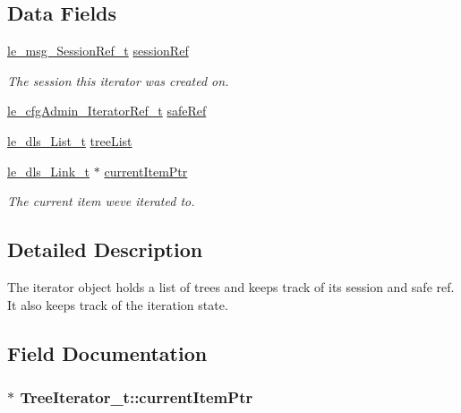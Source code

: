 \subsection*{Data Fields}
\begin{DoxyCompactItemize}
\item 
\hyperlink{le__messaging_8h_aebfc01e15b430a5b4f3038a5bd518904}{le\+\_\+msg\+\_\+\+Session\+Ref\+\_\+t} \hyperlink{struct_tree_iterator__t_af7f654c83f0817840efe7e783db1dfd8}{session\+Ref}
\begin{DoxyCompactList}\small\item\em The session this iterator was created on. \end{DoxyCompactList}\item 
\hyperlink{le__cfg_admin__interface_8h_a4349aae258f9dcf1fe96729dc2800157}{le\+\_\+cfg\+Admin\+\_\+\+Iterator\+Ref\+\_\+t} \hyperlink{struct_tree_iterator__t_af1e45b887ad102ea832cc39d37de981d}{safe\+Ref}
\item 
\hyperlink{structle__dls___list__t}{le\+\_\+dls\+\_\+\+List\+\_\+t} \hyperlink{struct_tree_iterator__t_a0715de82fec518e7e68a8ca8737df68b}{tree\+List}
\item 
\hyperlink{structle__dls___link__t}{le\+\_\+dls\+\_\+\+Link\+\_\+t} $\ast$ \hyperlink{struct_tree_iterator__t_aca3794088464801f725c06d668b5d458}{current\+Item\+Ptr}
\begin{DoxyCompactList}\small\item\em The current item we\textquotesingle{}ve iterated to. \end{DoxyCompactList}\end{DoxyCompactItemize}


\subsection{Detailed Description}
The iterator object holds a list of trees and keeps track of it\textquotesingle{}s session and safe ref. It also keeps track of the iteration state. 

\subsection{Field Documentation}
\subsubsection[{\texorpdfstring{current\+Item\+Ptr}{currentItemPtr}}]{$\ast$ Tree\+Iterator\+\_\+t\+::current\+Item\+Ptr}\hypertarget{struct_tree_iterator__t_aca3794088464801f725c06d668b5d458}{}\label{struct_tree_iterator__t_aca3794088464801f725c06d668b5d458}



